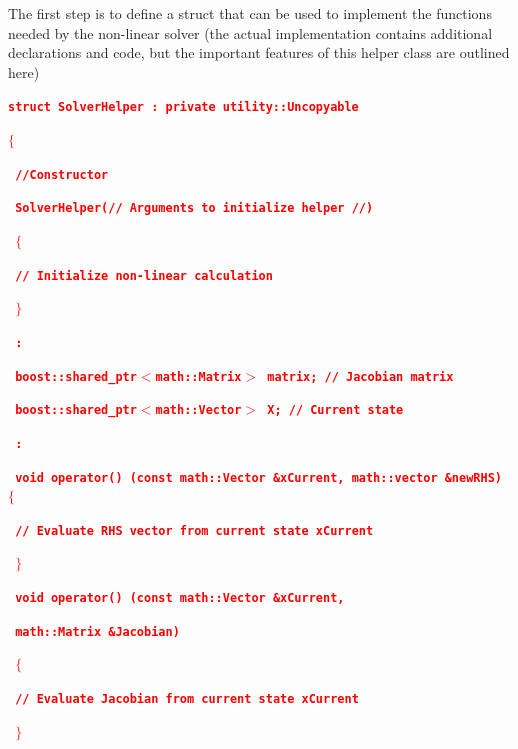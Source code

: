 \documentclass[12pt]{report} %
\begin{document}
The first step is to define a struct that can be used to implement the functions needed by the non-linear solver (the actual implementation contains additional declarations and code, but the important features of this helper class are outlined here)

\textcolor{red}{\texttt{\textbf{struct SolverHelper : private utility::Uncopyable}}}

\textcolor{red}{\texttt{\textbf{$\boldsymbol{\mathrm{\{}}$}}}

\textcolor{red}{\texttt{\textbf{  //Constructor}}}

\textcolor{red}{\texttt{\textbf{  SolverHelper(// Arguments to initialize helper //)}}}

\textcolor{red}{\texttt{\textbf{  $\boldsymbol{\mathrm{\{}}$}}}

\textcolor{red}{\texttt{\textbf{     // Initialize non-linear calculation}}}

\textcolor{red}{\texttt{\textbf{  $\boldsymbol{\mathrm{\}}}$}}}

\textcolor{red}{\texttt{\textbf{      :}}}

\textcolor{red}{\texttt{\textbf{  boost::shared\_ptr$\boldsymbol{\mathrm{<}}$math::Matrix$\boldsymbol{\mathrm{>}}$ matrix; // Jacobian matrix}}}

\textcolor{red}{\texttt{\textbf{  boost::shared\_ptr$\boldsymbol{\mathrm{<}}$math::Vector$\boldsymbol{\mathrm{>}}$ X; // Current state}}}

\textcolor{red}{\texttt{\textbf{      :}}}

\textcolor{red}{\texttt{\textbf{  void operator() (const math::Vector \&xCurrent, math::vector \&newRHS)  $\boldsymbol{\mathrm{\{}}$}}}

\textcolor{red}{\texttt{\textbf{     // Evaluate RHS vector from current state xCurrent}}}

\textcolor{red}{\texttt{\textbf{  $\boldsymbol{\mathrm{\}}}$}}}

\textcolor{red}{\texttt{\textbf{  void operator() (const math::Vector \&xCurrent,}}}

\textcolor{red}{\texttt{\textbf{                   math::Matrix \&Jacobian)}}}

\textcolor{red}{\texttt{\textbf{  $\boldsymbol{\mathrm{\{}}$}}}

\textcolor{red}{\texttt{\textbf{      // Evaluate Jacobian from current state xCurrent}}}

\textcolor{red}{\texttt{\textbf{  $\boldsymbol{\mathrm{\}}}$}}}
\end{document}
